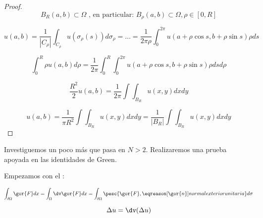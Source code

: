 		\begin{proof}
		\[ B_R (a,b) \subset \Omega\text{ , en particular: } B_{\rho}(a,b) \subset \Omega, \rho \in [0,R] \]

		\[ u(a,b) = \frac{1}{|C_\rho|} \int_{C_\rho}  u( \sigma_{\rho}(s) ) d\sigma_{\rho} = … = \frac{1}{2\pi\rho} \int_0^{2\pi} u(a + \rho\cos s, b+ \rho \sin s) \rho ds \]

		\[  \int_{0}^{R} \rho u (a,b) d \rho = \frac{1}{2\pi} \int_0^R \int_0^{2\pi} u(a + \rho \cos s , b + \rho \sin s) \rho ds d\rho \]

		\[ \frac{R^2}{2} u(a,b) = \frac{1}{2\pi}  \int\int_{B_R} u(x,y) dx dy \]

		\[ u(a,b) = \frac{1}{\pi R^2} \int\int_{B_R} u(x,y) dx dy = \frac{1}{|B_R|} \int\int_{B_R} u(x,y)dx dy \]

		\end{proof}


		Investiguemos un poco más que pasa en $N > 2$. Realizaremos una prueba apoyada en las identidades de Green.

		Empezamos con el :

		\[ \int_{\delta \Omega} \gor{F} dx = \int_{\Omega} \dv \gor{F}dx = \int_{\delta \Omega} \pesc{\gor{F},\eqreason[\gor{n}]{normal exterior unitaria}} d\sigma \]

		\[ \Delta u = \dv (\Delta u)\]

